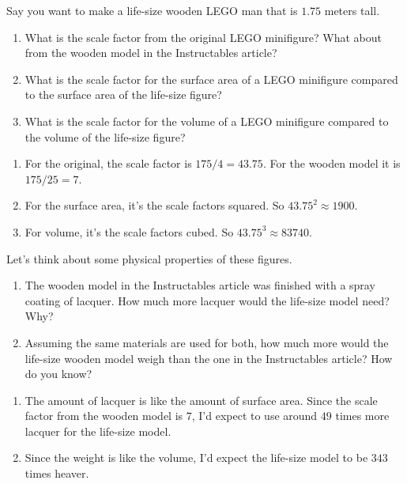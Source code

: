 \documentclass[handout,nooutcomes,noauthor,hints]{ximera}
\begin{document}
\begin{question}
 Say you want to make a life-size wooden LEGO man that is $1.75$
 meters tall.
 
\begin{enumerate}
 \item What is the scale factor from the original LEGO minifigure?
   What about from the wooden model in the Instructables article?
 \item What is the scale factor for the surface area of a LEGO
   minifigure compared to the surface area of the life-size figure?
 \item What is the scale factor for the volume of a LEGO
   minifigure compared to the volume of the life-size figure?
\end{enumerate}
\begin{freeResponse}
  \begin{enumerate}
\item For the original, the scale factor is $175/4 = 43.75$. For the wooden model it is $175/25 = 7$.
\item For the surface area, it's the scale factors squared. So $43.75^2\approx 1900$.
\item For volume, it's the scale factors cubed. So $43.75^3\approx 83740$.
  \end{enumerate}
\end{freeResponse}
\end{question}
\mynewpage

\begin{question}
  Let's think about some physical properties of these figures.
  \begin{enumerate}
 \item The wooden model in the Instructables article was finished with
   a spray coating of lacquer.  How much more lacquer would the life-size model need? Why?
 \item Assuming the same materials are used for both, how much more
   would the life-size wooden model weigh than the one in the
   Instructables article?  How do you know?
\end{enumerate}
  \begin{freeResponse}
    \begin{enumerate}
  \item The amount of lacquer is like the amount of surface
    area. Since the scale factor from the wooden model is $7$, I'd
    expect to use around $49$ times more lacquer for the life-size
    model.
  \item Since the weight is like the volume, I'd expect the life-size model to be $343$ times heaver.
    \end{enumerate}
    \end{freeResponse}
\end{question}
\end{document}
